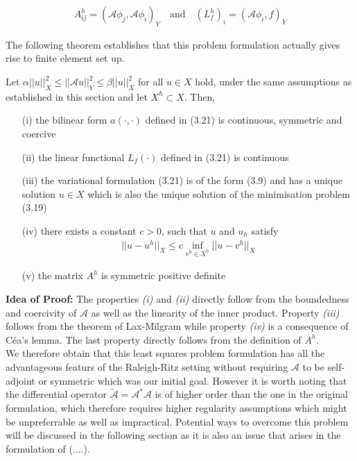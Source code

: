 \documentclass[../draft_1.tex]{subfiles}
\begin{document}
\begin{ceqn}
	\begin{align}
	A_{ij}^h = (\mathcal{A} \phi_j, \mathcal{A} \phi_i)_Y \quad \text{and} \quad (L_f^h)_i = (\mathcal{A} \phi_i, f)_Y
	\end{align}
\end{ceqn}
The following theorem establishes that this problem formulation actually gives rise to finite element set up. 

\begin{Theorem}
	Let $\alpha || u ||_X^2 \leq || \mathcal{A} u ||_Y^2 \leq \beta || u ||_X^2$ for all $u \in X$ hold, under the same assumptions as established in this section and let $X^h \subset X$. Then, 
	\begin{itemize}
		\item[(i)] the bilinear form $a(\cdot, \cdot)$ defined in (3.21) is continuous, symmetric and coercive
		\item[(ii)] the linear functional $L_f(\cdot)$ defined in (3.21) is continuous
		\item[(iii)] the variational formulation (3.21) is of the form (3.9) and has a unique solution $u \in X$ which is also the unique solution of the minimisation problem (3.19)
		\item[(iv)] there exists a constant $c > 0$, such that $u$ and $u_h$ satisfy 
		\begin{align}
		|| u - u^h ||_X \leq c \inf_{v^h \in X^h} || u - v^h||_X
		\end{align}
	    \item[(v)]	the matrix $A^h$ is symmetric positive definite	
	\end{itemize}
\end{Theorem}

\textbf{Idea of Proof:} The properties \textit{(i)} and \textit{(ii)} directly follow from the boundedness and coercivity of $\mathcal{A}$ as well as the linearity of the inner product. Property \textit{(iii)} follows from the theorem of Lax-Milgram while property \textit{(iv)} is a consequence of C\'{e}a's lemma. The last property directly follows from the definition of $A^h$.
\smallskip
\\
We therefore obtain that this least squares problem formulation has all the advantageous featurs of the Raleigh-Ritz setting without requiring $\mathcal{A}$ to be self-adjoint or symmetric which was our initial goal. However it is worth noting that the differential operator $\tilde{\mathcal{A}} = \mathcal{A}^* \mathcal{A}$ is of higher order than the one in the original formulation, which therefore requires higher regularity assumptions which might be unpreferrable as well as impractical. Potential ways to overcome this problem will be discussed in the following section as it is also an issue that arises in the formulation of (....).
 
\end{document}
